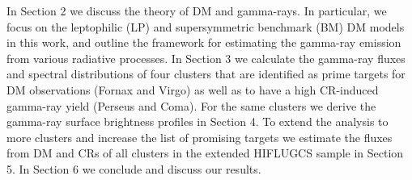 \documentclass[10pt,aps,pra,reprint,amsmath,amsfonts,amssymb,showpacs,nofootinbib,floatfix]{revtex4-1}
\begin{document}
In Section 2 we discuss the theory of DM and gamma-rays. In
particular, we focus on the leptophilic (LP) and supersymmetric
benchmark (BM) DM models in this work, and outline the framework for
estimating the gamma-ray emission from various radiative processes. In
Section 3 we calculate the gamma-ray fluxes and spectral distributions
of four clusters that are identified as prime targets for DM
observations (Fornax and Virgo) as well as to have a high CR-induced
gamma-ray yield (Perseus and Coma). For the same clusters we derive
the gamma-ray surface brightness profiles in Section 4. To extend the
analysis to more clusters and increase the list of promising targets we
estimate the fluxes from DM and CRs of all clusters in the extended
HIFLUGCS sample in Section 5. In Section 6 we conclude and discuss our
results.


\end{document}
